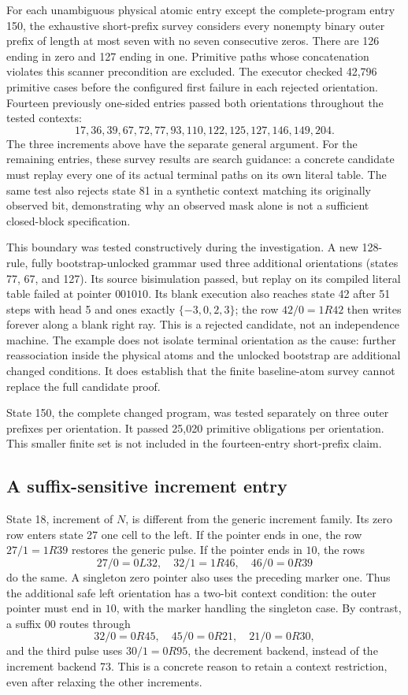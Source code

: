 For each unambiguous physical atomic entry except the complete-program entry
150, the exhaustive short-prefix survey considers every nonempty binary
outer prefix of length at most seven with no seven consecutive zeros.
There are 126 ending in zero and 127 ending in one. Primitive paths whose
concatenation violates this scanner precondition are excluded. The executor
checked 42,796 primitive cases before the configured first failure in each
rejected orientation. Fourteen previously one-sided entries passed both
orientations throughout the tested contexts:
\[
17,36,39,67,72,77,93,110,122,125,127,146,149,204.
\]
The three increments above have the separate general argument. For the
remaining entries, these survey results are search guidance: a concrete
candidate must replay every one of its actual terminal paths on its own
literal table. The same test also rejects state 81 in a synthetic context
matching its originally observed bit, demonstrating why an observed mask
alone is not a sufficient closed-block specification.

This boundary was tested constructively during the investigation. A new
128-rule, fully bootstrap-unlocked grammar used three additional orientations
(states 77, 67, and 127). Its source bisimulation passed, but replay on its
compiled literal table failed at pointer $001010$. Its blank execution
also reaches state 42 after 51 steps with head 5 and ones exactly
$\{-3,0,2,3\}$; the row $42/0=1R42$ then writes forever along a blank right
ray. This is a rejected candidate, not an independence machine. The example
does not isolate terminal orientation as the cause: further reassociation
inside the physical atoms and the unlocked bootstrap are additional changed
conditions. It does establish that the finite baseline-atom survey cannot
replace the full candidate proof.

State 150, the complete changed program, was tested separately on three
outer prefixes per orientation. It passed 25,020 primitive obligations per
orientation. This smaller finite set is not included in the fourteen-entry
short-prefix claim.

\subsection{A suffix-sensitive increment entry}

State 18, increment of $N$, is different from the generic increment family.
Its zero row enters state 27 one cell to the left. If the pointer ends in one,
the row $27/1=1R39$ restores the generic pulse. If the pointer ends in $10$,
the rows
\[
27/0=0L32,\quad32/1=1R46,\quad46/0=0R39
\]
do the same. A singleton zero pointer also uses the preceding marker one.
Thus the additional safe left orientation has a two-bit context condition:
the outer pointer must end in $10$, with the marker handling the singleton
case. By contrast, a suffix $00$ routes through
\[
32/0=0R45,\quad45/0=0R21,\quad21/0=0R30,
\]
and the third pulse uses $30/1=0R95$, the decrement backend, instead of the
increment backend 73. This is a concrete reason to retain a context
restriction, even after relaxing the other increments.

